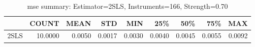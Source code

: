 \begin{table}[ht]
\centering
\caption{mse summary: Estimator=2SLS, Instruments=166, Strength=0.70}
\begin{tabular}{lrrrrrrrr}
\toprule
 & COUNT & MEAN & STD & MIN & 25\% & 50\% & 75\% & MAX \\
\midrule
2SLS & 10.0000 & 0.0050 & 0.0017 & 0.0030 & 0.0040 & 0.0045 & 0.0055 & 0.0092 \\
\bottomrule
\end{tabular}
\end{table}
